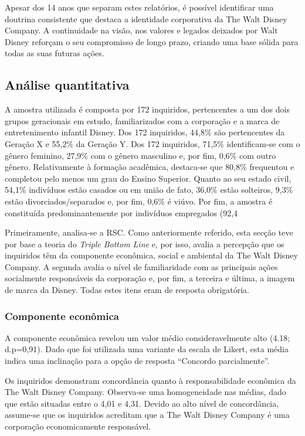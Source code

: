 \documentclass[portuguese]{textolivre}
\begin{document}
Apesar dos 14 anos que separam estes relatórios, é possível identificar uma doutrina consistente que destaca a identidade corporativa da The Walt Disney Company. A continuidade na visão, nos valores e legados deixados por Walt Disney reforçam o seu compromisso de longo prazo, criando uma base sólida para todas as suas futuras ações. 

\subsection{Análise quantitativa}\label{sec-format-simple}
A amostra utilizada é composta por 172 inquiridos, pertencentes a um dos dois grupos geracionais em estudo, familiarizados com a corporação e a marca de entretenimento infantil Disney. Dos 172 inquiridos, 44,8\% são pertencentes da Geração X e 55,2\% da Geração Y. Dos 172 inquiridos, 71,5\% identificam-se com o gênero feminino, 27,9\% com o gênero masculino e, por fim, 0,6\%  com outro gênero. Relativamente à formação acadêmica, destaca-se que 80,8\% frequentou e completou pelo menos um grau do Ensino Superior. Quanto ao seu estado civil, 54,1\% indivíduos estão casados ou em união de fato, 36,0\% estão solteiros, 9,3\% estão divorciados/separados e, por fim, 0,6\% é viúvo. Por fim, a amostra é constituída predominantemente por indivíduos empregados (92,4%

Primeiramente, analisa-se a RSC. Como anteriormente referido, esta secção teve por base a teoria do \textit{Triple Bottom Line} e, por isso, avalia a percepção que os inquiridos têm da componente econômica, social e ambiental da The Walt Disney Company. A segunda avalia o nível de familiaridade com as principais ações socialmente responsáveis da corporação e, por fim, a terceira e última, a imagem de marca da Disney. Todas estes itens eram de resposta obrigatória. 

\subsubsection{Componente econômica}\label{sec-links}
A componente econômica revelou um valor médio consideravelmente alto (4.18; d.p=0,91). Dado que foi utilizada uma variante da escala de Likert, esta média indica uma inclinação para a opção de resposta “Concordo parcialmente”. 

Os inquiridos demonstram concordância quanto à responsabilidade econômica da The Walt Disney Company. Observa-se uma homogeneidade nas médias, dado que estão situadas entre o 4,01 e 4,31. Devido ao alto nível de concordância, assume-se que os inquiridos acreditam que a The Walt Disney Company é uma corporação economicamente responsável. 
\end{document}
